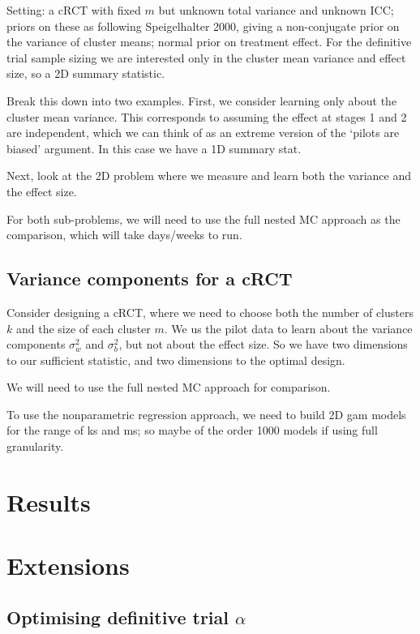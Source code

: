 \documentclass[sagev, Crown]{sagej} %
\begin{document}
Setting: a cRCT with fixed $m$ but unknown total variance and unknown ICC; priors on these as following Speigelhalter 2000, giving a non-conjugate prior on the variance of cluster means; normal prior on treatment effect. For the definitive trial sample sizing we are interested only in the cluster mean variance and effect size, so a 2D summary statistic.

Break this down into two examples. First, we consider learning only about the cluster mean variance. This corresponds to assuming the effect at stages 1 and 2 are independent, which we can think of as an extreme version of the `pilots are biased' argument. In this case we have a 1D summary stat.

Next, look at the 2D problem where we measure and learn both the variance and the effect size.

For both sub-problems, we will need to use the full nested MC approach as the comparison, which will take days/weeks to run.

\subsection{Variance components for a cRCT}

Consider designing a cRCT, where we need to choose both the number of clusters $k$ and the size of each cluster $m$. We us the pilot data to learn about the variance components $\sigma_w^2$ and $\sigma_b^2$, but not about the effect size. So we have two dimensions to our sufficient statistic, and two dimensions to the optimal design.

We will need to use the full nested MC approach for comparison.

To use the nonparametric regression approach, we need to build 2D gam models for the range of ks and ms; so maybe of the order 1000 models if using full granularity.

\section{Results}

\section{Extensions}

\subsection{Optimising definitive trial $\alpha$}
\end{document}
